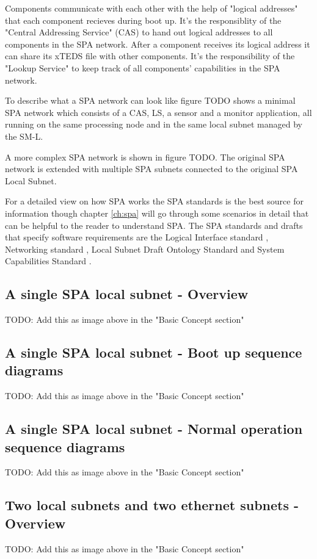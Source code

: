 Components communicate with each other with the help of "logical addresses"
that each component recieves during boot up. It's the responsiblity of the
"Central Addressing Service" (CAS) to hand out logical addresses to all
components in the SPA network. After a component receives its logical address
it can share its xTEDS file with other components. It's the responsibility of
the "Lookup Service" to keep track of all components' capabilities in the SPA
network.

To describe what a SPA network can look like figure TODO shows a minimal SPA
network which consists of a CAS, LS, a sensor and a monitor application, all
running on the same processing node and in the same local subnet managed by the
SM-L.

A more complex SPA network is shown in figure TODO. The original SPA network is
extended with multiple SPA subnets connected to the original SPA Local Subnet.

For a detailed view on how SPA works the SPA standards is the best source for
information though chapter \ref{ch:spa} will go through some scenarios in
detail that can be helpful to the reader to understand SPA. The SPA standards
and drafts that specify software requirements are the Logical Interface
standard \cite{spa:logical-interface}, Networking standard
\cite{spa:networking}, Local Subnet Draft \cite{spa:local-subnet} Ontology
Standard \cite{spa:ontology} and System Capabilities Standard
\cite{spa:system-capabilities}.

\subsection{A single SPA local subnet - Overview}
TODO: Add this as image above in the "Basic Concept section"

\subsection{A single SPA local subnet - Boot up sequence diagrams}
TODO: Add this as image above in the "Basic Concept section"

\subsection{A single SPA local subnet - Normal operation sequence diagrams}
TODO: Add this as image above in the "Basic Concept section"

\subsection{Two local subnets and two ethernet subnets - Overview}
TODO: Add this as image above in the "Basic Concept section"

